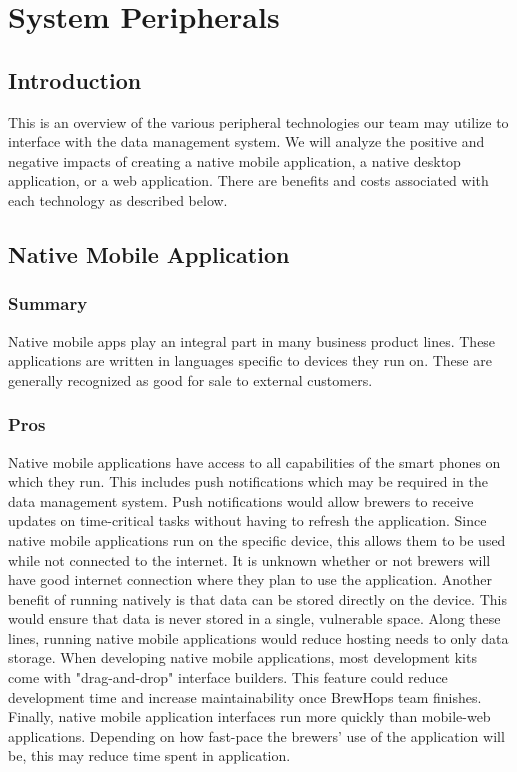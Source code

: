 \documentclass[draftclsnofoot,onecolumn,letterpaper,10pt,compsoc]{IEEEtran}
\begin{document}
		\section{System Peripherals}
		    \subsection{Introduction}
		        This is an overview of the various peripheral technologies our team may utilize to interface with the data management system.
		        We will analyze the positive and negative impacts of creating a native mobile application, a native desktop application, or a web application.
		        There are benefits and costs associated with each technology as described below.

			\subsection{Native Mobile Application}
		        \subsubsection{Summary}
		            Native mobile apps play an integral part in many business product lines.
		            These applications are written in languages specific to devices they run on.
		            These are generally recognized as good for sale to external customers\cite{SearchCloudOverview}.

		        \subsubsection{Pros}
		            Native mobile applications have access to all capabilities of the smart phones on which they run.
		            This includes push notifications which may be required in the data management system.
		            Push notifications would allow brewers to receive updates on time-critical tasks without having to refresh the application.
		            Since native mobile applications run on the specific device, this allows them to be used while not connected to the internet.
		            It is unknown whether or not brewers will have good internet connection where they plan to use the application.
		            Another benefit of running natively is that data can be stored directly on the device.
		            This would ensure that data is never stored in a single, vulnerable space.
		            Along these lines, running native mobile applications would reduce hosting needs to only data storage.
		            When developing native mobile applications, most development kits come with "drag-and-drop" interface builders.
		            This feature could reduce development time and increase maintainability once BrewHops team finishes.
		            Finally, native mobile application interfaces run more quickly than mobile-web applications.
		            Depending on how fast-pace the brewers' use of the application will be, this may reduce time spent in application.
\end{document}
